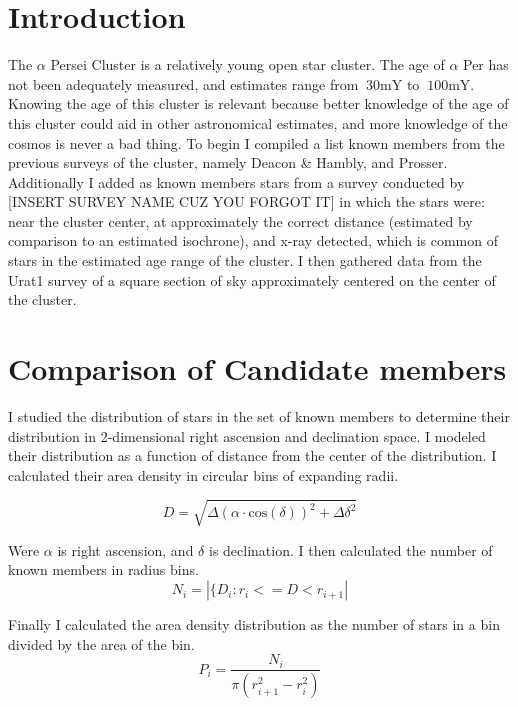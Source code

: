 \documentclass{article}
\begin{document}
\begin{multicols}{2}
\section{Introduction}
The $\alpha$ Persei Cluster is a relatively young open star cluster.  The age of $\alpha$ Per has not been adequately measured, and estimates range from $~30\mathrm{mY}$ to $~100\mathrm{mY}$.  Knowing the age of this cluster is relevant because better knowledge of the age of this cluster could aid in other astronomical estimates, and more knowledge of the cosmos is never a bad thing.  To begin I compiled a list known members from the previous surveys of the cluster, namely Deacon \& Hambly, and Prosser.  Additionally I added as known members stars from a survey conducted by [INSERT SURVEY NAME CUZ YOU FORGOT IT] in which the stars were: near the cluster center, at approximately the correct distance (estimated by comparison to an estimated isochrone), and x-ray detected, which is common of stars in the estimated age range of the cluster.  I then gathered data from the Urat1 survey of a square section of sky approximately centered on the center of the cluster.  

\section{Comparison of Candidate members}
I studied the distribution of stars in the set of known members to determine their distribution in 2-dimensional right ascension and declination space.  I modeled their distribution as a function of distance from the center of the distribution.  I calculated their area density in circular bins of expanding radii.

\begin{equation}
    D=\sqrt{\Delta\left( \alpha\cdot\mathrm{cos}(\delta)\right)^2+\Delta\delta^2}
\end{equation}

Were $\alpha$ is right ascension, and $\delta$ is declination.  I then calculated the number of known members in radius bins.  
\begin{equation}
    N_i=|\{D_i:r_i<=D<r_{i+1}|
\end{equation}

Finally I calculated the area density distribution as the number of stars in a bin divided by the area of the bin.
\begin{equation}
    P_i=\frac{N_i}{\pi(r_{i+1}^2-r_i^2)}
\end{equation}


\end{multicols}
\end{document}

